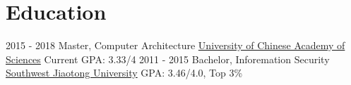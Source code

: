 \documentclass[letterpaper]{twentysecondcv} %
\begin{document}
\section{Education}

\begin{twenty} %
	\twentyitem
	{2015 - 2018}
	{Master, Computer Architecture}
	{\href{http://english.cas.cn/}{University of Chinese Academy of Sciences}}
	{}
	{Current GPA: 3.33/4}
	\twentyitem
	{2011 - 2015}
	{Bachelor, Inforemation Security}
	{\href{http://english.swjtu.edu.cn/}{Southwest Jiaotong University}}
	{}
	{GPA: 3.46/4.0, Top 3\%}
\end{twenty}
\end{document}
